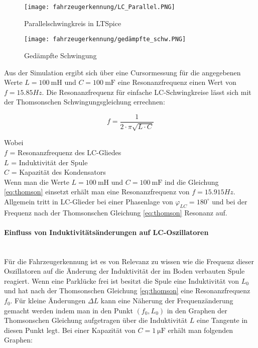 \begin{figure}[H]
    \centering
    \texttt{[image: fahrzeugerkennung/LC\_Parallel.PNG]}
    \caption{Parallelschwingkreis in LTSpice}
\end{figure}

\begin{figure}[H]
    \centering
    \texttt{[image: fahrzeugerkennung/gedämpfte\_schw.PNG]}
    \caption{Gedämpfte Schwingung}
\end{figure}

Aus der Simulation ergibt sich über eine Cursormessung für die angegebenen Werte $L = \SI{100}{\milli\henry}$ und $C = \SI{100}{\milli\farad}$ eine Resonanzfrequenz einen Wert von $f = 15.85Hz$. Die Resonanzfrequenz für einfache LC-Schwingkreise lässt sich mit der
Thomsonschen Schwingungsgleichung errechnen:

\begin{equation} \label{eq:thomson}
    f = \frac{1}{2 \cdot \pi \sqrt{L \cdot C}}
\end{equation}

Wobei \\
$f$ = Resonanzfrequenz des LC-Gliedes\\
$L$ = Induktivität der Spule\\
$C$ = Kapazität des Kondensators\\

Wenn man die Werte $L = \SI{100}{\milli\henry}$ und $C = \SI{100}{\milli\farad}$ ind die Gleichung \ref{eq:thomson} einsetzt erhält man eine Resonanzfrequenz von $f = 15.915Hz$.
Allgemein tritt in LC-Glieder bei einer Phasenlage von $\varphi_{LC} = 180^{\circ}$ und bei der Frequenz nach der Thomsonschen Gleichung \ref{eq:thomson}  Resonanz auf. 

\paragraph{Einfluss von Induktivitätsänderungen auf LC-Oszillatoren}\mbox{}\\

Für die Fahrzeugerkennung ist es von Relevanz zu wissen wie die Frequenz dieser Oszillatoren auf die Änderung der Induktivität der im Boden verbauten Spule reagiert.
Wenn eine Parklücke frei ist besitzt die Spule eine Induktivität von $L_{0}$ und hat nach der Thomsonschen Gleichung \ref{eq:thomson} eine Resonanzfrequenz $f_{0}$. Für kleine Änderungen $\Delta L$ kann eine Näherung
der Frequenzänderung gemacht werden indem man in den Punkt $(f_{0}, L_{0})$ in den Graphen der Thomsonschen Gleichung aufgetragen über die Induktivität $L$ eine Tangente in diesen Punkt legt. Bei einer 
Kapazität von $C = \SI{1}{\micro\farad}$ erhält man folgenden Graphen: 

